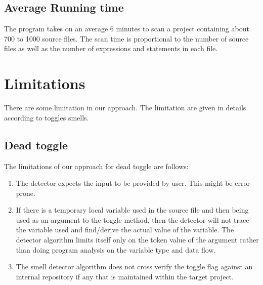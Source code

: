 \documentclass[conference]{IEEEtran}
\begin{document}
\subsection{Average Running time}
The program takes on an average 6 minutes to scan a project containing about 700 to 1000 source files. The scan time is proportional to the number of source files as well as the number of expressions and statements in each file. 

\section{Limitations}
\label{Limitation of our approach}
There are some limitation in our approach. The limitation are given in details according to toggles smells.
\subsection{Dead toggle}
The limitations of our approach for dead toggle are follows:

\begin{enumerate}
\item{The detector expects the input to be provided by user. This might be error prone.}
	
\item{If there is a temporary local variable used in the source file and then being used as an argument to the toggle method, then the detector will not trace the variable used and find/derive the actual value of the variable. The detector algorithm limits itself only on the token value of the argument rather than doing program analysis on the variable type and data flow.}
	
\item{The smell detector algorithm does not cross verify the toggle flag against an internal repository if any that is maintained within the target project.}
\end{enumerate}
\end{document}
